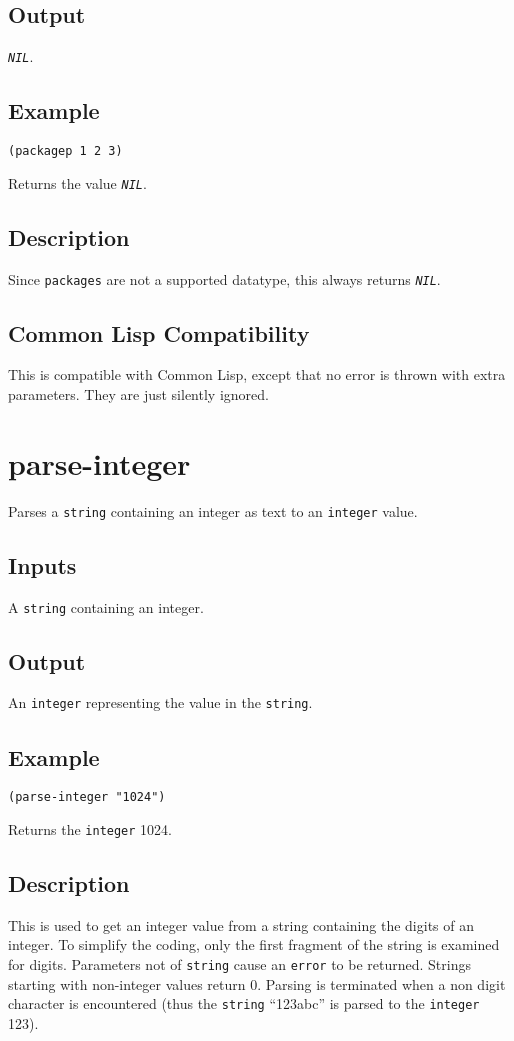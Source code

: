 \documentclass[10pt, openany]{book}
\newcommand{\constant}[1]{\emph{\texttt{#1}}}
\newcommand{\keyword}[1]{\texttt{#1}}
\newcommand{\datatype}[1]{\texttt{#1}}
\newcommand{\cl}{Common Lisp}
\begin{document}
\subsection{Output}
\constant{NIL}.
\subsection{Example}
\begin{lstlisting}
(packagep 1 2 3)
\end{lstlisting}
Returns the value \constant{NIL}.
\subsection{Description}
Since \datatype{packages} are not a supported datatype, this always returns \constant{NIL}.
\subsection{Common Lisp Compatibility}
This is compatible with \cl, except that no error is thrown with extra parameters.  They are just silently ignored.
\\
\section{parse-integer}
Parses a \datatype{string} containing an integer as text to an \datatype{integer} value.
\subsection{Inputs}
A \datatype{string} containing an integer.
\subsection{Output}
An \datatype{integer} representing the value in the \datatype{string}.
\subsection{Example}
\begin{lstlisting}
(parse-integer "1024")
\end{lstlisting}
Returns the \datatype{integer} 1024.
\subsection{Description}
This is used to get an integer value from a string containing the digits of an integer.  To simplify the coding, only the first fragment of the string is examined for digits.  Parameters not of \datatype{string} cause an \keyword{error} to be returned.  Strings starting with non-integer values return 0.  Parsing is terminated when a non digit character is encountered (thus the \datatype{string} ``123abc'' is parsed to the \datatype{integer} 123).
\end{document}
